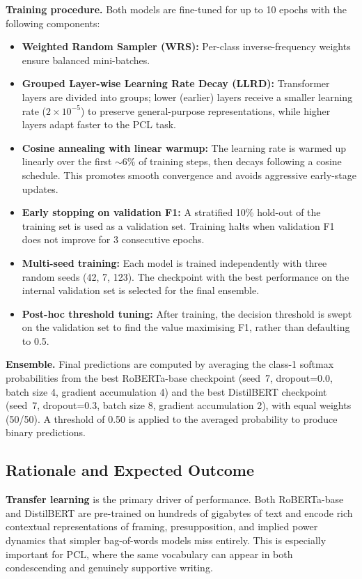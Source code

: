 \documentclass[11pt]{article}
\begin{document}
\textbf{Training procedure.} Both models are fine-tuned for up to 10 epochs with the following components:

\begin{itemize}[noitemsep]
    \item \textbf{Weighted Random Sampler (WRS):} Per-class inverse-frequency weights ensure balanced mini-batches.
    \item \textbf{Grouped Layer-wise Learning Rate Decay (LLRD):} Transformer layers are divided into groups; lower (earlier) layers receive a smaller learning rate ($2 \times 10^{-5}$) to preserve general-purpose representations, while higher layers adapt faster to the PCL task.
    \item \textbf{Cosine annealing with linear warmup:} The learning rate is warmed up linearly over the first $\sim$6\% of training steps, then decays following a cosine schedule. This promotes smooth convergence and avoids aggressive early-stage updates.
    \item \textbf{Early stopping on validation F1:} A stratified 10\% hold-out of the training set is used as a validation set. Training halts when validation F1 does not improve for 3 consecutive epochs.
    \item \textbf{Multi-seed training:} Each model is trained independently with three random seeds (42, 7, 123). The checkpoint with the best performance on the internal validation set is selected for the final ensemble.
    \item \textbf{Post-hoc threshold tuning:} After training, the decision threshold is swept on the validation set to find the value maximising F1, rather than defaulting to 0.5.
\end{itemize}

\textbf{Ensemble.} Final predictions are computed by averaging the class-1 softmax probabilities from the best RoBERTa-base checkpoint (seed~7, dropout=0.0, batch size 4, gradient accumulation 4) and the best DistilBERT checkpoint (seed~7, dropout=0.3, batch size 8, gradient accumulation 2), with equal weights (50/50). A threshold of 0.50 is applied to the averaged probability to produce binary predictions.

\subsection{Rationale and Expected Outcome}

\textbf{Transfer learning} is the primary driver of performance. Both RoBERTa-base and DistilBERT are pre-trained on hundreds of gigabytes of text and encode rich contextual representations of framing, presupposition, and implied power dynamics that simpler bag-of-words models miss entirely. This is especially important for PCL, where the same vocabulary can appear in both condescending and genuinely supportive writing.
\end{document}
